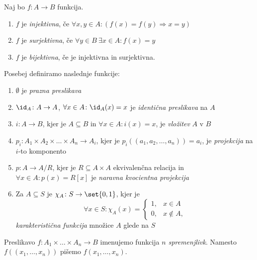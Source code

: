 \documentclass[12pt, a4paper]{article}
\renewcommand{\implies}{\Rightarrow}
\begin{document}
\begin{okvir}
\begin{definicija}
Naj bo $f\colon A\to B$ funkcija.

\begin{enumerate}
\item $f$ je \emph{injektivna}, če $\forall x,y\in A\colon(f(x)=f(y)\implies x=y)$
\item $f$ je \emph{surjektivna}, če $\forall y\in B~\exists x\in A\colon f(x)=y$
\item $f$ je \emph{bijektivna}, če je injektivna in surjektivna.
\end{enumerate}
\end{definicija}
\end{okvir}

\begin{definicija}
Posebej definiramo naslednje funkcije:

\begin{enumerate}
\item $\emptyset$ je \emph{prazna preslikava}
\item $\id_A\colon A\to A$, $\forall x\in A\colon\id_A(x)=x$ je \emph{identična preslikava} na $A$
\item $i\colon A\to B$, kjer je $A\subseteq B$ in $\forall x\in A\colon i(x)=x$, je \emph{vložitev} $A$ v $B$
\item $p_i\colon A_1\times A_2\times\dots\times A_n\to A_i$, kjer je $p_i((a_1,a_2,\dots,a_n))=a_i$, je \emph{projekcija} na $i$-to komponento
\item $p\colon A\to A/R$, kjer je $R\subseteq A\times A$ ekvivalenčna relacija in $\forall x\in A\colon p(x)=R[x]$ je \emph{naravna kvocientna projekcija}
\item Za $A\subseteq S$ je $\chi_A\colon S\to\set{0,1}$, kjer je
\[
\forall x\in S\colon\chi_A(x)=\begin{cases}
1, & x\in A \\
0, & x\not\in A,
\end{cases}
\]
\emph{karakteristična funkcija} množice $A$ glede na $S$
\end{enumerate}
\end{definicija}

\begin{definicija}
Preslikavo $f\colon A_1\times\dots\times A_n\to B$ imenujemo funkcija \emph{$n$ spremenjlivk}. Namesto $f((x_1,\dots,x_n))$ pišemo $f(x_1,\dots,x_n)$.
\end{definicija}
\end{document}
